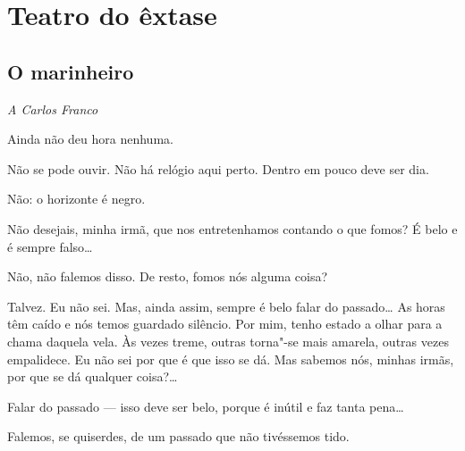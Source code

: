 \part{Teatro do êxtase}

\chapter[O marinheiro]{O marinheiro}

\hfill\textit{A Carlos Franco}


 Ainda não deu hora nenhuma.

 Não se pode ouvir. Não há relógio aqui perto.
Dentro em pouco deve ser dia.

 Não: o horizonte é negro.

 Não desejais, minha irmã, que nos entretenhamos
contando o
que fomos? É belo e é sempre falso\ldots{}

 Não, não falemos disso. De resto,
fomos nós alguma coisa?

 Talvez. Eu não sei. Mas, ainda assim,
sempre é belo falar do
passado\ldots{} As horas têm caído e nós temos guardado
silêncio. Por mim,
tenho estado a olhar para a chama daquela vela.
Às vezes treme, outras
torna"-se mais amarela, outras vezes empalidece.
Eu não sei por que é
que isso se dá. Mas sabemos nós, minhas irmãs, por
que se dá qualquer coisa?\ldots{}

\hfill{} 

 Falar do passado --- isso deve ser belo,
porque é inútil e faz tanta pena\ldots{}

 Falemos, se quiserdes, de um passado
que não tivéssemos tido.

